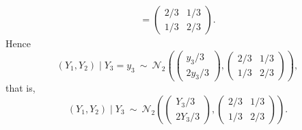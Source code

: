 \begin{example}
\[\begin{aligned}
  =\begin{pmatrix}2/3&1/3\\1/3&2/3\end{pmatrix}.
\end{aligned}
\]
Hence
\[
  (Y_1,Y_2)\mid Y_3=y_3\ \sim\ \mathcal N_2\left(\begin{pmatrix}y_3/3\\2y_3/3\end{pmatrix},\begin{pmatrix}2/3&1/3\\1/3&2/3\end{pmatrix}\right),
\]
that is,
\[
  (Y_1,Y_2)\mid Y_3\ \sim\ \mathcal N_2\left(\begin{pmatrix}Y_3/3\\2Y_3/3\end{pmatrix},\begin{pmatrix}2/3&1/3\\1/3&2/3\end{pmatrix}\right).
\]


\end{example}
